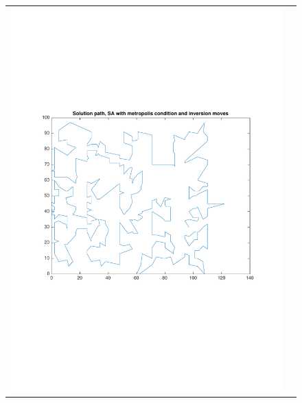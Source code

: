 \documentclass[a4paper, 11pt]{scrartcl}
\begin{document}
\begin{figure}[!ht]
\begin{tabular}{cc}
    \includegraphics[scale=0.4, trim={3cm 6cm 1cm 6cm}]{../figures/solutionPath_SA_metropolis_inversion.pdf} & 

\end{tabular}
\end{figure}
\end{document}
